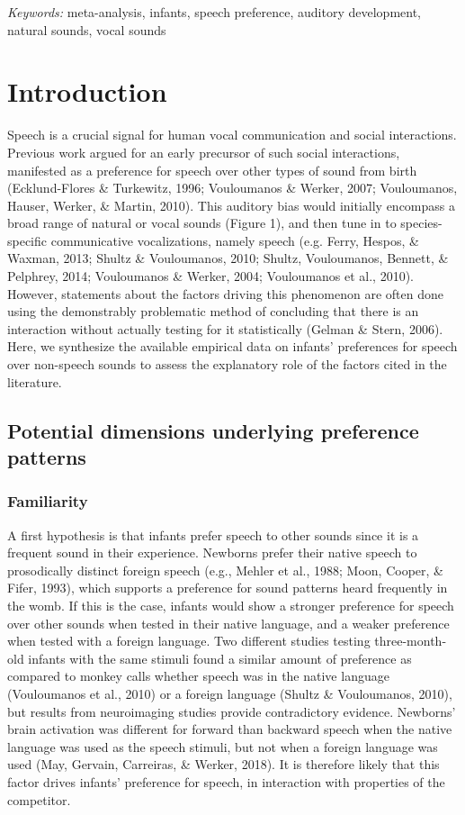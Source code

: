 \documentclass[man]{apa6}
\begin{document}
\emph{Keywords:} meta-analysis, infants, speech preference, auditory
development, natural sounds, vocal sounds

\section{Introduction}\label{introduction}

Speech is a crucial signal for human vocal communication and social
interactions. Previous work argued for an early precursor of such social
interactions, manifested as a preference for speech over other types of
sound from birth (Ecklund-Flores \& Turkewitz, 1996; Vouloumanos \&
Werker, 2007; Vouloumanos, Hauser, Werker, \& Martin, 2010). This
auditory bias would initially encompass a broad range of natural or
vocal sounds (Figure 1), and then tune in to species-specific
communicative vocalizations, namely speech (e.g. Ferry, Hespos, \&
Waxman, 2013; Shultz \& Vouloumanos, 2010; Shultz, Vouloumanos, Bennett,
\& Pelphrey, 2014; Vouloumanos \& Werker, 2004; Vouloumanos et al.,
2010). However, statements about the factors driving this phenomenon are
often done using the demonstrably problematic method of concluding that
there is an interaction without actually testing for it statistically
(Gelman \& Stern, 2006). Here, we synthesize the available empirical
data on infants' preferences for speech over non-speech sounds to assess
the explanatory role of the factors cited in the literature.

\subsection{Potential dimensions underlying preference
patterns}\label{potential-dimensions-underlying-preference-patterns}

\subsubsection{Familiarity}\label{familiarity}

A first hypothesis is that infants prefer speech to other sounds since
it is a frequent sound in their experience. Newborns prefer their native
speech to prosodically distinct foreign speech (e.g., Mehler et al.,
1988; Moon, Cooper, \& Fifer, 1993), which supports a preference for
sound patterns heard frequently in the womb. If this is the case,
infants would show a stronger preference for speech over other sounds
when tested in their native language, and a weaker preference when
tested with a foreign language. Two different studies testing
three-month-old infants with the same stimuli found a similar amount of
preference as compared to monkey calls whether speech was in the native
language (Vouloumanos et al., 2010) or a foreign language (Shultz \&
Vouloumanos, 2010), but results from neuroimaging studies provide
contradictory evidence. Newborns' brain activation was different for
forward than backward speech when the native language was used as the
speech stimuli, but not when a foreign language was used (May, Gervain,
Carreiras, \& Werker, 2018). It is therefore likely that this factor
drives infants' preference for speech, in interaction with properties of
the competitor.
\end{document}
